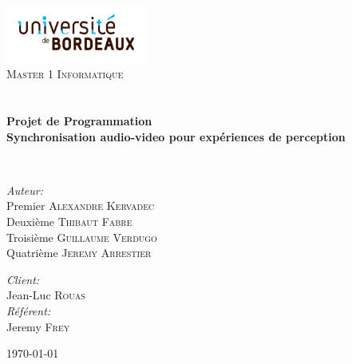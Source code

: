 \begin{titlepage}
\begin{center}

\includegraphics[width=0.35\textwidth]{./logo}~\\[1cm]

\textsc{\LARGE Master 1 Informatique}\\[1.5cm]

\textsc{\Large }\\[0.5cm]

\HRule \\[0.4cm]

{\huge \bfseries Projet de Programmation\\
Synchronisation audio-video pour expériences de perception \\[0.4cm] }

\HRule \\[1.5cm]

\begin{minipage}{0.4\textwidth}
\begin{flushleft} \large
\emph{Auteur:}\\
Premier \textsc{Alexandre Kervadec}\\
Deuxième \textsc{Thibaut Fabre}\\
Troisième \textsc{Guillaume Verdugo}\\
Quatrième \textsc{Jeremy Arrestier}
\end{flushleft}
\end{minipage}
\begin{minipage}{0.4\textwidth}
\begin{flushright} \large
\emph{Client:} \\
Jean-Luc \textsc{Rouas}\\
\emph{Référent:} \\
Jeremy \textsc{Frey}
\end{flushright}
\end{minipage}

\vfill

{\large \today}

\end{center}
\end{titlepage}
